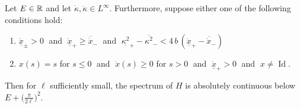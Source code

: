 \begin{thm}
    Let $E \in \mathbb{R}$ and let $\dot\kappa, \ddot\kappa \in L^\infty$. Furthermore, suppose either one of the following conditions hold:
    \begin{enumerate}
        \item $\underline{\dot x}_\pm > 0 \;$ and $\; \underline{\dot x}_+ \geq \overline{\dot x}_- \;$ and $\; \underline{\kappa^2}_+ - \overline{\kappa^2}_- < 4 \, b \, (\underline{\dot x}_+ - \overline{\dot x}_-)$
        \item $x(s) = s$ for $s \leq 0 \;$ and $\; \dot x(s) \geq 0$ for $s>0 \;$ and $\; \underline{\dot x}_+ > 0 \;$ and $\; x \neq \operatorname{Id}$.
    \end{enumerate}
    Then for $\ell$ sufficiently small, the spectrum of $H$ is absolutely continuous below $E + \big( \frac{\pi}{2\ell} \big)^2$.
\end{thm}

